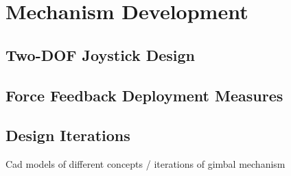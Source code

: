 \section{Mechanism Development}
\label{sec:mechanism_development}

\subsection{Two-DOF Joystick Design}
\label{sub:two_dof_joystick_design}


\subsection{Force Feedback Deployment Measures}
\label{sub:force_feedback_deployment_measures}


\subsection{Design Iterations}
\label{sub:design_iterations}

Cad models of different concepts / iterations of gimbal mechanism

